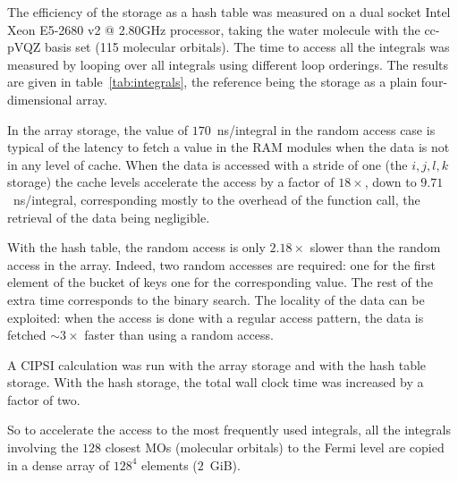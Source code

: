 \documentclass[./thesis.tex]{subfiles}
\begin{document}


The efficiency of the storage as a hash table was measured on a dual socket Intel Xeon E5-2680 v2 @ 2.80GHz processor, taking the water molecule with the cc-pVQZ basis set (115 molecular orbitals). The time to access all the integrals was measured by looping over all integrals using different loop orderings. The results are given in table~\ref{tab:integrals}, the reference being the storage as a plain four-dimensional array.

In the array storage,
the value of $170$~ns/integral in the random access case is typical of the latency to fetch a value in the RAM modules when the data is not in any level of cache.
When the data is accessed with a stride of one (the $i,j,l,k$ storage) the cache levels accelerate the access by a factor of $18 \times$, down to $9.71$~ns/integral, corresponding mostly to the overhead of the function call, the retrieval of the data being negligible.

With the hash table, the random access is only $2.18\times$ slower than the random access in the array. Indeed, two random accesses are required: one for the first element of the bucket of keys one for the corresponding value. The rest of the extra time corresponds to the binary search. The locality of the data can be exploited: when the access is done with a regular access pattern, the data is fetched $\sim 3\times$ faster than using a random access.

A CIPSI calculation was run with the array storage and with the hash table storage. With the hash storage, the total wall clock time was increased by a factor of two.

So to accelerate the access to the most frequently used integrals, all the
integrals involving the $128$ closest MOs (molecular orbitals) to the Fermi
level are copied in a dense array of $128^4$ elements ($2$~GiB).
\end{document}

